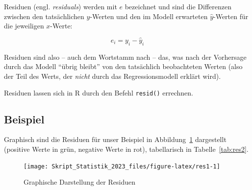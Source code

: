 \documentclass[
  11pt,
  ngerman,
  a4paper,
]{report}
\newenvironment{rtip}{
  \medskip
  \begin{tcolorbox}[colframe=purple,colback=light_gray,title=Softwarehinweis]
}{
  \end{tcolorbox}
  \medskip
}
\begin{document}
Residuen (engl. \emph{residuals}) werden mit \(e\) bezeichnet und sind die Differenzen zwischen den tatsächlichen \(y\)-Werten und den im Modell erwarteten \(\hat{y}\)-Werten für die jeweiligen \(x\)-Werte:

\nopagebreak

\[
e_i=y_i-\hat{y}_i
\label{eq:res}
\]

Residuen sind also -- auch dem Wortstamm nach -- das, was nach der Vorhersage durch das Modell \enquote{übrig bleibt} von den tatsächlich beobachteten Werten (also der Teil des Werts, der \emph{nicht} durch das Regressionsmodell erklärt wird).

\begin{rtip}
Residuen lassen sich in R durch den Befehl \verb|resid()| errechnen.
\end{rtip}

\hypertarget{beispiel-27}{%
\subsection{Beispiel}\label{beispiel-27}}

Graphisch sind die Residuen für unser Beispiel in Abbildung~\ref{fig:res1} dargestellt (positive Werte in grün, negative Werte in rot), tabellarisch in Tabelle~\ref{tab:res2}.

\begin{figure}[!h]

{\centering \texttt{[image: Skript\_Statistik\_2023\_files/figure-latex/res1-1]} 

}

\caption{Graphische Darstellung der Residuen}\label{fig:res1}
\end{figure}
\end{document}

